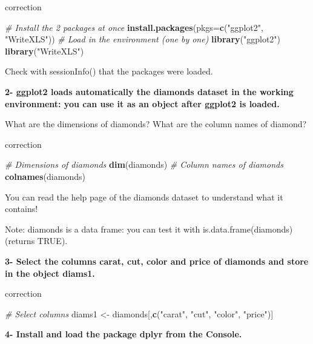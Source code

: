 \documentclass[]{book}
\newenvironment{Shaded}{\begin{snugshade}}{\end{snugshade}}
\newcommand{\CommentTok}[1]{\textcolor[rgb]{0.56,0.35,0.01}{\textit{#1}}}
\newcommand{\DataTypeTok}[1]{\textcolor[rgb]{0.13,0.29,0.53}{#1}}
\newcommand{\KeywordTok}[1]{\textcolor[rgb]{0.13,0.29,0.53}{\textbf{#1}}}
\newcommand{\NormalTok}[1]{#1}
\newcommand{\StringTok}[1]{\textcolor[rgb]{0.31,0.60,0.02}{#1}}
\begin{document}
correction

\begin{Shaded}
\begin{Highlighting}[]
\CommentTok{# Install the 2 packages at once}
\KeywordTok{install.packages}\NormalTok{(}\DataTypeTok{pkgs=}\KeywordTok{c}\NormalTok{(}\StringTok{"ggplot2"}\NormalTok{, }\StringTok{"WriteXLS"}\NormalTok{))}
\CommentTok{# Load in the environment (one by one)}
\KeywordTok{library}\NormalTok{(}\StringTok{"ggplot2"}\NormalTok{)}
\KeywordTok{library}\NormalTok{(}\StringTok{"WriteXLS"}\NormalTok{)}
\end{Highlighting}
\end{Shaded}

Check with sessionInfo() that the packages were loaded.

\textbf{2- ggplot2 loads automatically the diamonds dataset in the working environment: you can use it as an object after ggplot2 is loaded.}

What are the dimensions of diamonds? What are the column names of diamond?

correction

\begin{Shaded}
\begin{Highlighting}[]
\CommentTok{# Dimensions of diamonds}
\KeywordTok{dim}\NormalTok{(diamonds)}
\CommentTok{# Column names of diamonds}
\KeywordTok{colnames}\NormalTok{(diamonds)}
\end{Highlighting}
\end{Shaded}

You can read the help page of the diamonds dataset to understand what it contains!

Note: diamonds is a data frame: you can test it with is.data.frame(diamonds) (returns TRUE).

\textbf{3- Select the columns carat, cut, color and price of diamonds and store in the object diams1.}

correction

\begin{Shaded}
\begin{Highlighting}[]
\CommentTok{# Select columns}
\NormalTok{diams1 <-}\StringTok{ }\NormalTok{diamonds[,}\KeywordTok{c}\NormalTok{(}\StringTok{"carat"}\NormalTok{, }\StringTok{"cut"}\NormalTok{, }\StringTok{"color"}\NormalTok{, }\StringTok{"price"}\NormalTok{)]}
\end{Highlighting}
\end{Shaded}

\textbf{4- Install and load the package dplyr from the Console.}
\end{document}

